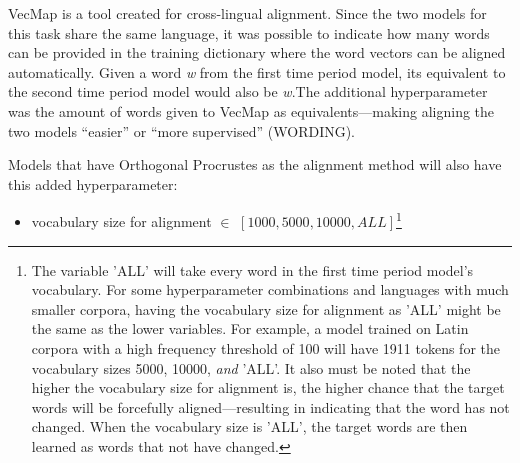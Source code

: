 VecMap is a tool created for cross-lingual alignment. Since the two models for this task share the same language, it was possible to indicate how many words can be provided in the training dictionary where the word vectors can be aligned automatically. Given a word \emph{w} from the first time period model, its equivalent to the second time period model would also be \emph{w}.The additional hyperparameter was the amount of words given to VecMap as equivalents—making aligning the two models “easier” or “more supervised” (WORDING).


Models that have Orthogonal Procrustes as the alignment method will also have this added hyperparameter:
\begin{itemize}
    \item vocabulary size for alignment $\in$ $[1000, 5000, 10000, ALL]$\footnote{The variable 'ALL' will take every word in the first time period model's vocabulary. For some hyperparameter combinations and languages with much smaller corpora, having the vocabulary size for alignment as 'ALL' might be the same as the lower variables. For example, a model trained on Latin corpora with a high frequency threshold of 100 will have 1911 tokens for the vocabulary sizes 5000, 10000, \emph{and} 'ALL'. It also must be noted that the higher the vocabulary size for alignment is, the higher chance that the target words will be forcefully aligned—resulting in indicating that the word has not changed. When the vocabulary size is 'ALL', the target words are then learned as words that not have changed.} 
\end{itemize}%


